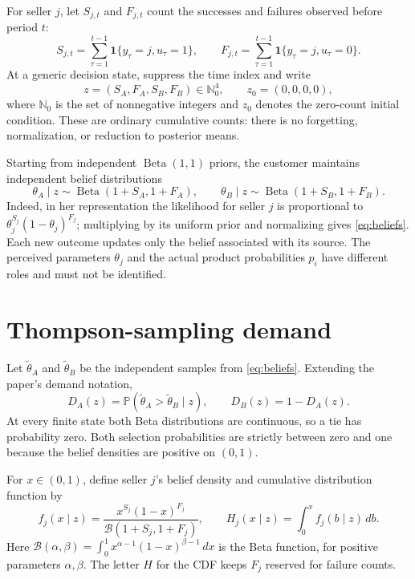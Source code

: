 \documentclass[11pt]{article}
\newcommand{\Pb}{\mathbb P}
\newcommand{\Ind}[1]{\mathbf 1\{#1\}}
\newcommand{\Bfun}{\mathcal B}
\begin{document}
For seller $j$, let $S_{j,t}$ and $F_{j,t}$ count the successes and
failures observed before period $t$:
\begin{equation}\label{eq:counts}
S_{j,t}=\sum_{\tau=1}^{t-1}\Ind{y_\tau=j,u_\tau=1},
\qquad
F_{j,t}=\sum_{\tau=1}^{t-1}\Ind{y_\tau=j,u_\tau=0}.
\end{equation}
At a generic decision state, suppress the time index and write
\begin{equation}\label{eq:state}
z=(S_A,F_A,S_B,F_B)\in\mathbb N_0^4,
\qquad z_0=(0,0,0,0),
\end{equation}
where $\mathbb N_0$ is the set of nonnegative integers and $z_0$ denotes
the zero-count initial condition. These are ordinary cumulative counts:
there is no forgetting, normalization, or reduction to posterior means.

Starting from independent $\operatorname{Beta}(1,1)$ priors, the customer
maintains independent belief distributions
\begin{equation}\label{eq:beliefs}
\theta_A\mid z\sim\operatorname{Beta}(1+S_A,1+F_A),\qquad
\theta_B\mid z\sim\operatorname{Beta}(1+S_B,1+F_B).
\end{equation}
Indeed, in her representation the likelihood for seller $j$ is
proportional to $\theta_j^{S_j}(1-\theta_j)^{F_j}$; multiplying by its
uniform prior and normalizing gives \eqref{eq:beliefs}. Each new outcome
updates only the belief associated with its source. The perceived
parameters $\theta_j$ and the actual product probabilities $p_i$ have
different roles and must not be identified.

\section{Thompson-sampling demand}

Let $\widetilde\theta_A$ and $\widetilde\theta_B$ be the independent
samples from \eqref{eq:beliefs}. Extending the paper's demand notation,
\begin{equation}\label{eq:demand-definition}
D_A(z)=\Pb(\widetilde\theta_A>\widetilde\theta_B\mid z),
\qquad D_B(z)=1-D_A(z).
\end{equation}
At every finite state both Beta distributions are continuous, so a tie
has probability zero. Both selection probabilities are strictly between
zero and one because the belief densities are positive on $(0,1)$.

For $x\in(0,1)$, define seller $j$'s belief density and cumulative
distribution function by
\begin{equation}\label{eq:density-cdf}
f_j(x\mid z)=\frac{x^{S_j}(1-x)^{F_j}}{\Bfun(1+S_j,1+F_j)},
\qquad H_j(x\mid z)=\int_0^x f_j(b\mid z)\,db.
\end{equation}
Here $\Bfun(\alpha,\beta)=\int_0^1 x^{\alpha-1}(1-x)^{\beta-1}\,dx$
is the Beta function, for positive parameters $\alpha,\beta$.
The letter $H$ for the CDF keeps $F_j$ reserved for failure counts.
\end{document}
